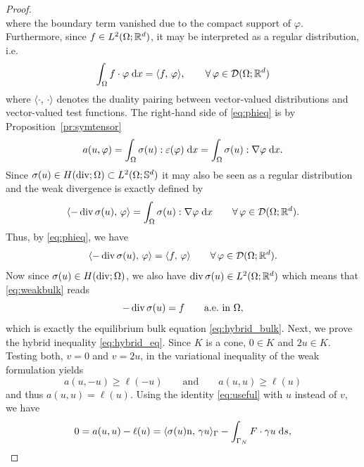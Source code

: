 \begin{proof}
\begin{equation*}
	\end{equation*}
	where the boundary term vanished due to the compact support of $\varphi$. Furthermore, since $f\in L^2(\Omega;{\mathbb R}^d)$, it may be interpreted as a regular distribution, i.e.
	\begin{equation*}
		\int_\Omega f\cdot\varphi\;{{\mathrm{d}} x} = \langle f,\,\varphi\rangle, \qquad \forall\,\varphi\in{\mathcal D}(\Omega;{\mathbb R}^d)
	\end{equation*}
	where $\langle\cdot,\,\cdot\rangle$ denotes the duality pairing between vector-valued distributions and vector-valued test functions. The right-hand side of \eqref{eq:phieq} is by Proposition~\ref{pr:symtensor}
	\begin{equation*}
		a(u,\varphi) = \int_\Omega\sigma(u):\varepsilon(\varphi)\;{{\mathrm{d}} x} = \int_\Omega\sigma(u):\nabla\varphi\;{{\mathrm{d}} x}.
	\end{equation*}
	Since $\sigma(u)\in H(\diver;\Omega)\subset L^2(\Omega;\S^d)$ it may also be seen as a regular distribution and the weak divergence is exactly defined by
	\begin{equation*}
		\langle -\diver\sigma(u),\,\varphi\rangle = \int_\Omega\sigma(u):\nabla \varphi\;\dx\qquad\forall\,\varphi\in\cD(\Omega;\R^d).
	\end{equation*}
	Thus, by \eqref{eq:phieq}, we have
	\begin{equation}\label{eq:weakbulk}
		\langle -\diver\sigma(u),\,\varphi\rangle = \langle f,\,\varphi\rangle\qquad\forall\,\varphi\in\cD(\Omega;\R^d).
	\end{equation}
	Now since $\sigma(u)\in H(\diver;\Omega)$, we also have $\diver\sigma(u)\in L^2(\Omega;\R^d)$ which means that \eqref{eq:weakbulk} reads
	\begin{equation*}
		-\diver\sigma(u) = f\qquad\text{a.e.\ in }\Omega,
	\end{equation*}
	which is exactly the equilibrium bulk equation \eqref{eq:hybrid_bulk}. Next, we prove the hybrid inequality \eqref{eq:hybrid_eq}. Since $K$ is a cone, $0\in K$ and $2u\in K$. Testing both, $v = 0$ and $v = 2u$, in the variational inequality of the weak formulation yields
	\begin{equation*}
		a(u,-u)\ge \ell(-u)\qquad\text{and}\qquad a(u,u)\ge \ell(u)
	\end{equation*}
	and thus $a(u,u) = \ell(u)$. Using the identity \eqref{eq:useful} with $u$ instead of $v$, we have
	\begin{equation*}
		0 = a(u,u)-\ell(u) = \langle \sigma(u)\mathrm{n},\,\gamma u\rangle_\Gamma-\int_{\Gamma_N}F\cdot\gamma u\;{{\mathrm{d}} s},
	\end{equation*}

\end{proof}
